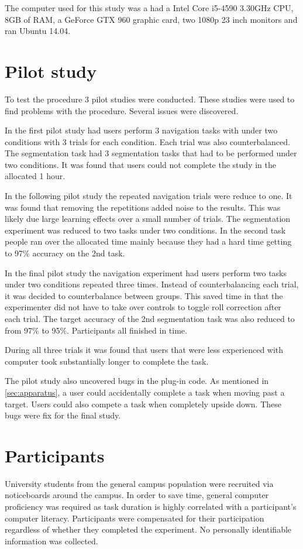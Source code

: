 The computer used for this study was a had a Intel Core i5-4590 3.30GHz CPU, 8GB of RAM, a GeForce GTX 960 graphic card, two 1080p 23 inch monitors and ran Ubuntu 14.04.

\section{Pilot study}
To test the procedure 3 pilot studies were conducted. These studies were used to find problems with the procedure. Several issues were discovered.

In the first pilot study had users perform 3 navigation tasks with under two conditions with 3 trials for each condition. Each trial was also counterbalanced. The segmentation task had 3 segmentation tasks that had to be performed under two conditions. It was found that users could not complete the study in the allocated 1 hour.

In the following pilot study the repeated navigation trials were reduce to one. It was found that removing the repetitions added noise to the results. This was likely due large learning effects over a small number of trials. The segmentation experiment was reduced to two tasks under two conditions. In the second task people ran over the allocated time mainly because they had a hard time getting to 97\% accuracy on the 2nd task.

In the final pilot study the navigation experiment had users perform two tasks under two conditions repeated three times. Instead of counterbalancing each trial, it was decided to counterbalance between groups. This saved time in that the experimenter did not have to take over controls to toggle roll correction after each trial. The target accuracy of the 2nd segmentation task was also reduced to from 97\% to 95\%. Participants all finished in time.

During all three trials it was found that users that were less experienced with computer took substantially longer to complete the task.

The pilot study also uncovered bugs in the plug-in code. As mentioned in \autoref{sec:apparatus}, a user could accidentally complete a task when moving past a target. Users could also compete a task when completely upside down. These bugs were fix for the final study.

\section{Participants}
University students from the general campus population were recruited via noticeboards around the campus. In order to save time, general computer proficiency was required as task duration is highly correlated with a participant's computer literacy. Participants were compensated for their participation regardless of whether they completed the experiment. No personally identifiable information was collected.


